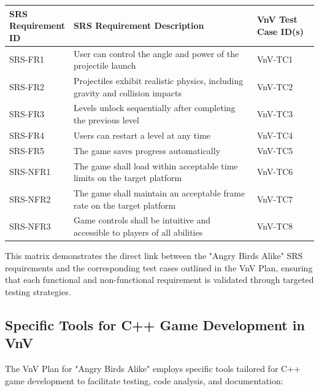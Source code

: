 \documentclass[12pt]{article}
\begin{document}
\begin{longtable}{|p{0.2\linewidth}|p{0.6\linewidth}|p{0.2\linewidth}|}
\hline
\textbf{SRS Requirement ID} & \textbf{SRS Requirement Description} & \textbf{VnV Test Case ID(s)} \\
\hline
SRS-FR1 & User can control the angle and power of the projectile launch & VnV-TC1 \\
SRS-FR2 & Projectiles exhibit realistic physics, including gravity and collision impacts & VnV-TC2 \\
SRS-FR3 & Levels unlock sequentially after completing the previous level & VnV-TC3 \\
SRS-FR4 & Users can restart a level at any time & VnV-TC4 \\
SRS-FR5 & The game saves progress automatically & VnV-TC5 \\
SRS-NFR1 & The game shall load within acceptable time limits on the target platform & VnV-TC6 \\
SRS-NFR2 & The game shall maintain an acceptable frame rate on the target platform & VnV-TC7 \\
SRS-NFR3 & Game controls shall be intuitive and accessible to players of all abilities & VnV-TC8 \\
\hline
\end{longtable}

This matrix demonstrates the direct link between the "Angry Birds Alike" SRS requirements and the corresponding test cases outlined in the VnV Plan, ensuring that each functional and non-functional requirement is validated through targeted testing strategies.

\subsection{Specific Tools for C++ Game Development in VnV}
The VnV Plan for "Angry Birds Alike" employs specific tools tailored for C++ game development to facilitate testing, code analysis, and documentation:
\end{document}
